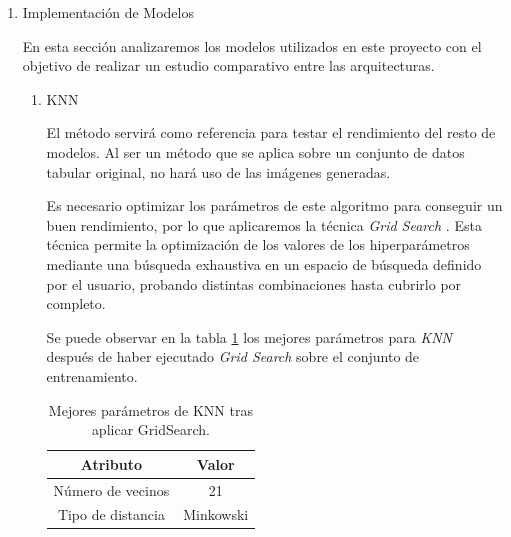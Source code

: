\begin{enumerate}
\begin{figure}[H]
                \label{SampledImagesExampleImage}
            \end{figure}

        \item Implementación de Modelos

            En esta sección analizaremos los modelos utilizados en este proyecto con el objetivo de realizar un estudio comparativo entre las arquitecturas.


            \begin{enumerate}

                \item KNN

                    El método  servirá como referencia para testar el rendimiento del resto de modelos. Al ser un método que se aplica sobre un conjunto de datos tabular original, no hará uso de las imágenes generadas.

                    Es necesario optimizar los parámetros de este algoritmo para conseguir un buen rendimiento, por lo que aplicaremos la técnica \textit{Grid Search} \cite{GridSearchSklearnLibrary}. Esta técnica permite la optimización de los valores de los hiperparámetros mediante una búsqueda exhaustiva en un espacio de búsqueda definido por el usuario, probando distintas combinaciones hasta cubrirlo por completo. 


                    Se puede observar en la tabla \ref{BestParamsKNNGridSearchTable} los mejores parámetros para \textit{KNN} después de haber ejecutado \textit{Grid Search} sobre el conjunto de entrenamiento.\\

                    \begin{table}[H]
                        \centering
                        \begin{tabular}{ |c|c| }
                            \hline
                            Atributo & Valor\\
                            \hline
                                Número de vecinos & 21 \\ 
                                Tipo de distancia & Minkowski \\ 
                            \hline
                        \end{tabular}
                        \caption{Mejores parámetros de KNN tras aplicar GridSearch.}
                        \label{BestParamsKNNGridSearchTable}
                    \end{table}



\end{enumerate}
\end{enumerate}
